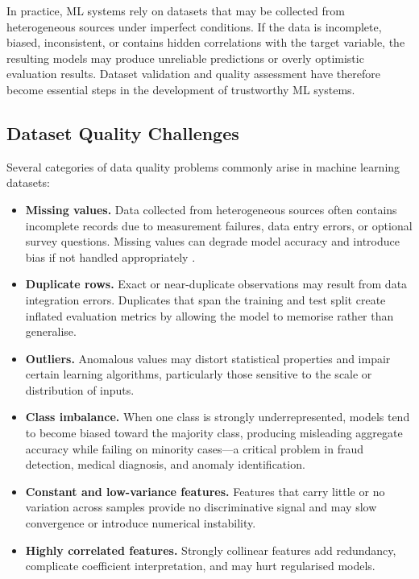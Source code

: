 \documentclass[12pt,a4paper]{report}
\begin{document}
In practice, ML systems rely on datasets that may be collected from heterogeneous sources
under imperfect conditions.  If the data is incomplete, biased, inconsistent, or contains
hidden correlations with the target variable, the resulting models may produce unreliable
predictions or overly optimistic evaluation results.  Dataset validation and quality assessment
have therefore become essential steps in the development of trustworthy ML systems.

\subsection{Dataset Quality Challenges}

Several categories of data quality problems commonly arise in machine learning datasets:

\begin{itemize}[leftmargin=1.5em]
\item \textbf{Missing values.}  Data collected from heterogeneous sources often contains
incomplete records due to measurement failures, data entry errors, or optional survey
questions.  Missing values can degrade model accuracy and introduce bias if not handled
appropriately \cite{mckinney2010}.

\item \textbf{Duplicate rows.}  Exact or near-duplicate observations may result from data
integration errors.  Duplicates that span the training and test split create inflated
evaluation metrics by allowing the model to memorise rather than generalise.

\item \textbf{Outliers.}  Anomalous values may distort statistical properties and impair
certain learning algorithms, particularly those sensitive to the scale or distribution of inputs.

\item \textbf{Class imbalance.}  When one class is strongly underrepresented, models tend to
become biased toward the majority class, producing misleading aggregate accuracy while
failing on minority cases---a critical problem in fraud detection, medical diagnosis, and
anomaly identification.

\item \textbf{Constant and low-variance features.}  Features that carry little or no variation
across samples provide no discriminative signal and may slow convergence or introduce
numerical instability.

\item \textbf{Highly correlated features.}  Strongly collinear features add redundancy,
complicate coefficient interpretation, and may hurt regularised models.
\end{itemize}
\end{document}
